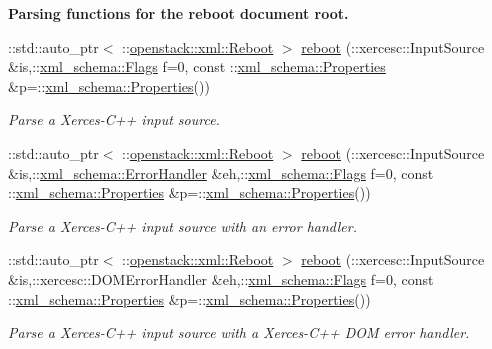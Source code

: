 \begin{Indent}{\bf Parsing functions for the reboot document root.}
\begin{DoxyCompactItemize}
::std::auto\_\-ptr$<$ ::\hyperlink{classopenstack_1_1xml_1_1Reboot}{openstack::xml::Reboot} $>$ \hyperlink{namespaceopenstack_1_1xml_a58823e9cb7c6073cfff77d0d156da4e1}{reboot} (::xercesc::InputSource \&is,::\hyperlink{namespacexml__schema_affb4c227cbd9aa7453dd1dc5a1401943}{xml\_\-schema::Flags} f=0, const ::\hyperlink{namespacexml__schema_ad27ce19a7ee1d3b1064092648898f64c}{xml\_\-schema::Properties} \&p=::\hyperlink{namespacexml__schema_ad27ce19a7ee1d3b1064092648898f64c}{xml\_\-schema::Properties}())
\begin{DoxyCompactList}\small\item\em Parse a Xerces-\/C++ input source. \item\end{DoxyCompactList}\item 
::std::auto\_\-ptr$<$ ::\hyperlink{classopenstack_1_1xml_1_1Reboot}{openstack::xml::Reboot} $>$ \hyperlink{namespaceopenstack_1_1xml_a27edcd1f1cbde9121e8296b246526d04}{reboot} (::xercesc::InputSource \&is,::\hyperlink{namespacexml__schema_ab1c9361bfd3b404eaabf0c31eded79dc}{xml\_\-schema::ErrorHandler} \&eh,::\hyperlink{namespacexml__schema_affb4c227cbd9aa7453dd1dc5a1401943}{xml\_\-schema::Flags} f=0, const ::\hyperlink{namespacexml__schema_ad27ce19a7ee1d3b1064092648898f64c}{xml\_\-schema::Properties} \&p=::\hyperlink{namespacexml__schema_ad27ce19a7ee1d3b1064092648898f64c}{xml\_\-schema::Properties}())
\begin{DoxyCompactList}\small\item\em Parse a Xerces-\/C++ input source with an error handler. \item\end{DoxyCompactList}\item 
::std::auto\_\-ptr$<$ ::\hyperlink{classopenstack_1_1xml_1_1Reboot}{openstack::xml::Reboot} $>$ \hyperlink{namespaceopenstack_1_1xml_a5b3111bba7b55ff69fd988e269c5072d}{reboot} (::xercesc::InputSource \&is,::xercesc::DOMErrorHandler \&eh,::\hyperlink{namespacexml__schema_affb4c227cbd9aa7453dd1dc5a1401943}{xml\_\-schema::Flags} f=0, const ::\hyperlink{namespacexml__schema_ad27ce19a7ee1d3b1064092648898f64c}{xml\_\-schema::Properties} \&p=::\hyperlink{namespacexml__schema_ad27ce19a7ee1d3b1064092648898f64c}{xml\_\-schema::Properties}())
\begin{DoxyCompactList}\small\item\em Parse a Xerces-\/C++ input source with a Xerces-\/C++ DOM error handler. \item\end{DoxyCompactList}\item 

\end{DoxyCompactItemize}
\end{Indent}
